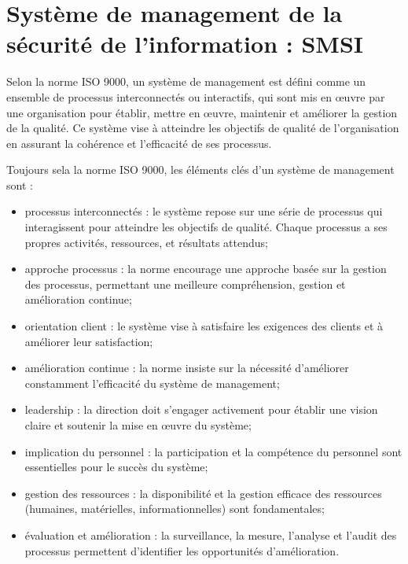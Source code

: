 \section{Système de management de la sécurité de l'information : SMSI}

Selon la norme ISO 9000, un système de management est défini comme un ensemble de processus interconnectés ou interactifs, qui sont mis en œuvre par une organisation pour établir, mettre en œuvre, maintenir et améliorer la gestion de la qualité. Ce système vise à atteindre les objectifs de qualité de l'organisation en assurant la cohérence et l'efficacité de ses processus.

Toujours sela la norme ISO 9000, les éléments clés d'un système de management sont : 
\begin{itemize}
   \item processus interconnectés : le système repose sur une série de processus qui interagissent pour atteindre les objectifs de qualité. Chaque processus a ses propres activités, ressources, et résultats attendus;
   \item approche processus : la norme encourage une approche basée sur la gestion des processus, permettant une meilleure compréhension, gestion et amélioration continue;
   \item orientation client : le système vise à satisfaire les exigences des clients et à améliorer leur satisfaction;
   \item amélioration continue : la norme insiste sur la nécessité d'améliorer constamment l'efficacité du système de management;
   \item leadership : la direction doit s'engager activement pour établir une vision claire et soutenir la mise en œuvre du système;
   \item implication du personnel : la participation et la compétence du personnel sont essentielles pour le succès du système;
   \item gestion des ressources : la disponibilité et la gestion efficace des ressources (humaines, matérielles, informationnelles) sont fondamentales;
   \item évaluation et amélioration : la surveillance, la mesure, l'analyse et l'audit des processus permettent d'identifier les opportunités d'amélioration.
\end{itemize}

